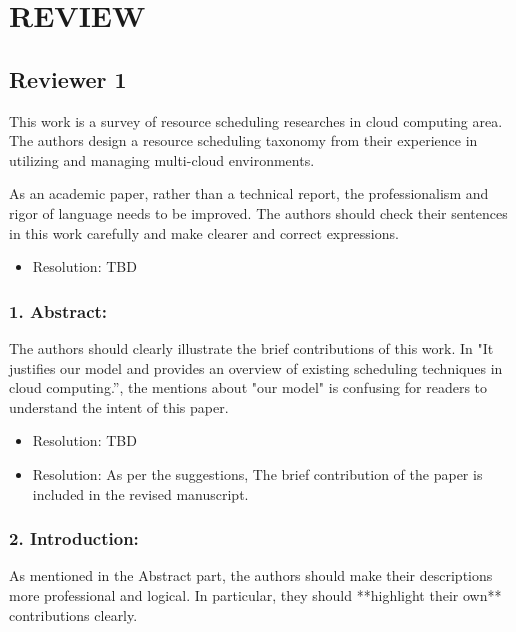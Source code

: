 \section {REVIEW}

\newcommand{\RESOLUTION}[1]{\color{red}\begin{itemize} \item Resolution: #1\end{itemize}\color{black}}

\newcommand{\OK}[1]{\color{blue}\begin{itemize} \item Resolution: #1\end{itemize}\color{black}}


\subsection{Reviewer 1}

This work is a survey of resource scheduling researches in cloud
computing area. The authors design a resource scheduling taxonomy from
their experience in utilizing and managing multi-cloud environments.


As an academic paper, rather than a technical report, the
professionalism and rigor of language needs to be improved. The
authors should check their sentences in this work carefully and make
clearer and correct expressions. 

\RESOLUTION{TBD}

\subsubsection{1. Abstract:}

The authors should clearly illustrate the brief
contributions of this work. In "It justifies our model and provides an
overview of existing scheduling techniques in cloud computing.”, the
mentions about "our model" is confusing for readers to understand the
intent of this paper.

\RESOLUTION{TBD}
\OK{ As per the suggestions, The brief contribution of the paper is included in the revised manuscript.}


\subsubsection{2. Introduction:}

As mentioned in the Abstract part, the authors should
make their descriptions more professional and logical. In particular,
they should **highlight their own** contributions clearly.

